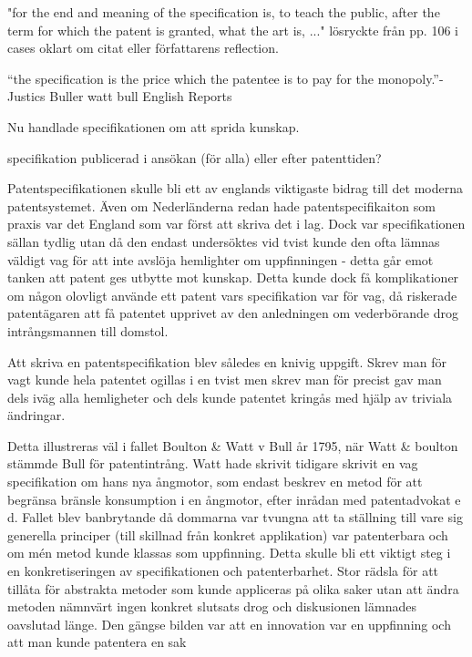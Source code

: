 "for the end and meaning of the specification is, to teach the public, after the term for which the patent is granted, what the art is, ..." \cite{cases-davies} lösryckte från pp. 106 i cases oklart om citat eller författarens reflection.


“the specification is the price which 
the patentee is to pay for the monopoly.”-Justics Buller watt bull \cite{2 H. Bl. 463, 472, 126 Eng. Rep. 651, 656 (C.P. 1795)} English Reports

Nu handlade specifikationen om att sprida kunskap.

specifikation publicerad i ansökan (för alla) eller efter patenttiden?

Patentspecifikationen skulle bli ett av englands viktigaste bidrag till det
moderna patentsystemet. Även om
Nederländerna redan hade patentspecifikaiton som praxis var det England som var först att skriva det i
lag. \cite{macleod} Dock var specifikationen sällan tydlig utan då den endast undersöktes vid tvist
kunde den ofta lämnas väldigt vag för att inte avslöja hemlighter om uppfinningen - detta går emot tanken
att patent ges utbytte mot kunskap. Detta kunde dock få komplikationer om någon olovligt använde ett
patent vars specifikation var för vag, då riskerade patentägaren att få patentet upprivet av den anledningen om vederbörande drog intrångsmannen till domstol.

Att skriva en patentspecifikation blev således en knivig uppgift. Skrev man för vagt kunde hela patentet
ogillas i en tvist men skrev man för precist gav man dels iväg alla hemligheter och dels kunde patentet
kringås med hjälp av triviala ändringar\cite{macleod}. 

Detta illustreras väl i fallet Boulton \& Watt v Bull år 1795, när Watt \& boulton stämmde Bull för patentintrång. Watt hade skrivit tidigare skrivit en vag specifikation om hans nya ångmotor, som endast beskrev en metod för att begränsa bränsle konsumption i en ångmotor, efter inrådan med patentadvokat e d\cite{bracha}. Fallet blev banbrytande då dommarna var tvungna att ta ställning till vare sig generella principer (till skillnad från konkret applikation) var patenterbara och om mén metod kunde klassas som uppfinning\cite{bracha}. Detta skulle bli ett viktigt steg i en konkretiseringen av specifikationen och patenterbarhet. Stor rädsla för att tillåta för abstrakta metoder som kunde appliceras på olika saker utan att ändra metoden nämnvärt ingen konkret slutsats drog och diskusionen lämnades oavslutad länge. Den gängse bilden var att en innovation var en uppfinning och att man kunde patentera en sak \cite{bracha}

